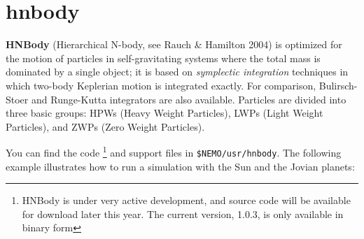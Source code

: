 
\section{hnbody}

{\bf HNBody} (Hierarchical N-body, see Rauch \& Hamilton 2004)
is optimized for 
the motion of particles in self-gravitating systems where the total mass
is dominated by a single object; it is based on 
{\it symplectic integration} techniques 
in which two-body Keplerian motion is integrated exactly. 
For comparison, 
Bulirsch-Stoer and Runge-Kutta integrators are also available.
Particles are divided into three basic groups:
HPWs (Heavy Weight Particles), LWPs (Light Weight Particles), and
ZWPs (Zero Weight Particles).

You can find the code
\footnote{HNBody is under very active development, and source code will be 
available for download later this year. The current version, 1.0.3, is only
available in binary form}
and support files in {\tt \$NEMO/usr/hnbody}. The following example illustrates
how to run a simulation with the Sun and the Jovian planets:

